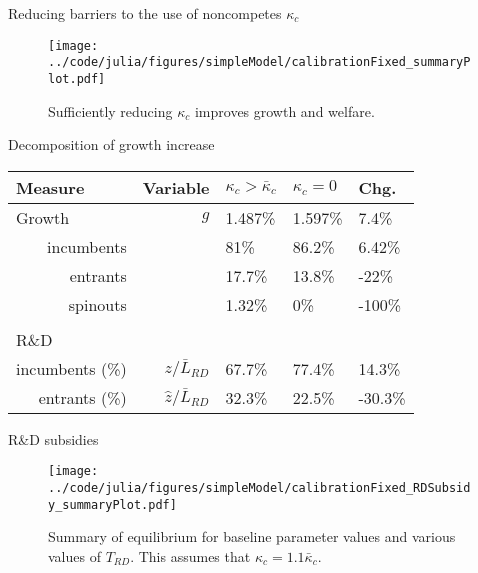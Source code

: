 \documentclass[english,usenames,dvipsnames]{beamer}
\begin{document}
\begin{frame}{Reducing barriers to the use of noncompetes $\kappa_c$} \label{reducing_kappa_c} 
	\hyperlink{reducing_kappa_c_table}{}
	\begin{figure}[]
		\texttt{[image: ../code/julia/figures/simpleModel/calibrationFixed\_summaryPlot.pdf]}
		\caption{Sufficiently reducing $\kappa_c$ improves growth and welfare.}
	\end{figure}
\end{frame}

\begin{frame}{Decomposition of growth increase}\label{decomposition_growth_increase}
	\hyperlink{reducing_kappa_c_table}{}
	\begin{table}
		\centering
		\footnotesize
		\begin{tabular}{lrlll}
			\toprule \toprule
			Measure & Variable & $\kappa_c > \bar{\kappa}_c$ & $\kappa_c = 0$ & Chg. \tabularnewline
			\midrule
			Growth & $g$ & 1.487\% & 1.597\% & 7.4\% \tabularnewline
			\multicolumn{1}{r}{incumbents} &  & 81\% & 86.2\% & 6.42\% \tabularnewline
			\multicolumn{1}{r}{entrants} &  & 17.7\% & 13.8\% & -22\% \tabularnewline
			\multicolumn{1}{r}{spinouts} &  & 1.32\% & 0\% & -100\% \tabularnewline
			\tabularnewline
			R\&D & & & & 
			\tabularnewline
			\multicolumn{1}{r}{incumbents (\%)}  & $z / \bar{L}_{RD}$ & 67.7\% & 77.4\% & 14.3\% \tabularnewline 
			
			\multicolumn{1}{r}{entrants (\%)}  & $\hat{z} / \bar{L}_{RD}$ & 32.3\% & 22.5\% & -30.3\% \tabularnewline
			\bottomrule
		\end{tabular}
	\end{table}
\end{frame}

\begin{frame}{R\&D subsidies} \label{plots:rd_subsidies} 
	\hyperlink{RDsubsidy_table}{}
	\begin{figure}[]
		\texttt{[image: ../code/julia/figures/simpleModel/calibrationFixed\_RDSubsidy\_summaryPlot.pdf]}
		\caption{Summary of equilibrium for baseline parameter values and various values of $T_{RD}$. This assumes that $\kappa_c = 1.1 \bar{\kappa}_c$.}
		\label{calibration_RDSubsidy_summaryPlot}
	\end{figure}
\end{frame}
\end{document}
